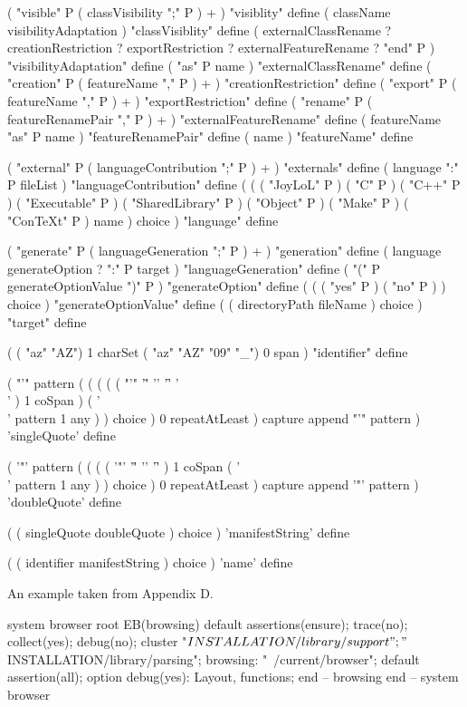 ( "visible" P ( classVisibility ";" P ) + ) "visiblity" define
( className visibilityAdaptation ) "classVisiblity" define
(
  externalClassRename ?
  creationRestriction ?
  exportRestriction ?
  externalFeatureRename ?
  "end" P 
) "visibilityAdaptation" define
( "as" P name ) "externalClassRename" define
( "creation" P ( featureName "," P ) + ) "creationRestriction" define
( "export" P ( featureName "," P ) + ) "exportRestriction" define
( "rename" P ( featureRenamePair "," P ) + ) "externalFeatureRename" define
( featureName "as" P name ) "featureRenamePair" define
( name ) "featureName" define

( "external" P ( languageContribution ";" P ) + ) "externals" define
( language ":" P fileList ) "languageContribution" define
(
  (
    ( "JoyLoL" P )
    ( "C" P )
    ( "C++" P )
    ( "Executable" P )
    ( "SharedLibrary" P )
    ( "Object" P )
    ( "Make" P )
    ( "ConTeXt" P )
    name
  ) choice
) "language" define

( "generate" P ( languageGeneration ";" P ) + ) "generation" define
( language generateOption ? ":" P target ) "languageGeneration" define
( "(" P generateOptionValue ")" P ) "generateOption" define
(
  (
    ( "yes" P )
    ( "no" P )
  ) choice
) "generateOptionValue" define
( ( directoryPath fileName ) choice ) "target" define

(
  ( "az" "AZ") 1 charSet
  ( "az" "AZ" "09" "_") 0 span
) "identifier" define

(
  "'" pattern
  (
    ( 
      (
        ( ( "'" '\r' '\n' '\f' '\\' ) 1 coSpan )
        ( '\\' pattern 1 any )
      ) choice
    ) 0 repeatAtLeast
  ) capture append
  "'" pattern
) 'singleQuote' define

(
  '"' pattern
  (
    ( 
      (
        ( '"' '\r' '\n' '\f' ) 1 coSpan
        ( '\\' pattern 1 any )
      ) choice
    ) 0 repeatAtLeast
  ) capture append
  '"' pattern
) 'doubleQuote' define

(
  ( singleQuote doubleQuote ) choice
) 'manifestString' define

(
  ( identifier manifestString ) choice
) 'name' define
\stopJoylol

An example taken from \cite{meyer1992eiffelTheLanguage} Appendix D.

\starttyping
system browser root
  EB(browsing)
default
  assertions(ensure); 
  trace(no);
  collect(yes);
  debug(no);
cluster
  "$INSTALLATION/library/support";
  "$INSTALLATION/library/parsing";
  browsing: "~/current/browser";
  default
    assertion(all);
  option
    debug(yes): Layout, functions;
  end -- browsing
end -- system browser
\stoptyping

